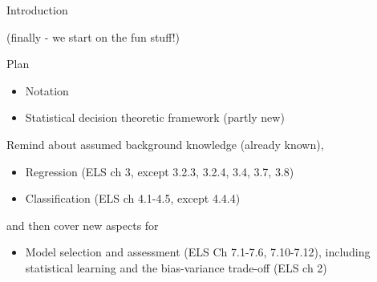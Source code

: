 \documentclass[
  ignorenonframetext,
]{beamer}
\providecommand{\tightlist}{%
  \setlength{\itemsep}{0pt}\setlength{\parskip}{0pt}}
\begin{document}
\begin{frame}{Introduction}
\protect\hypertarget{introduction}{}

(finally - we start on the fun stuff!)

\begin{block}{Plan}

\begin{itemize}
\tightlist
\item
  Notation
\item
  Statistical decision theoretic framework (partly new)
\end{itemize}

Remind about assumed background knowledge (already known),

\begin{itemize}
\tightlist
\item
  Regression (ELS ch 3, except 3.2.3, 3.2.4, 3.4, 3.7, 3.8)
\item
  Classification (ELS ch 4.1-4.5, except 4.4.4)
\end{itemize}

and then cover new aspects for

\begin{itemize}
\tightlist
\item
  Model selection and assessment (ELS Ch 7.1-7.6, 7.10-7.12), including
  statistical learning and the bias-variance trade-off (ELS ch 2)
\end{itemize}

\end{block}

\end{frame}
\end{document}
